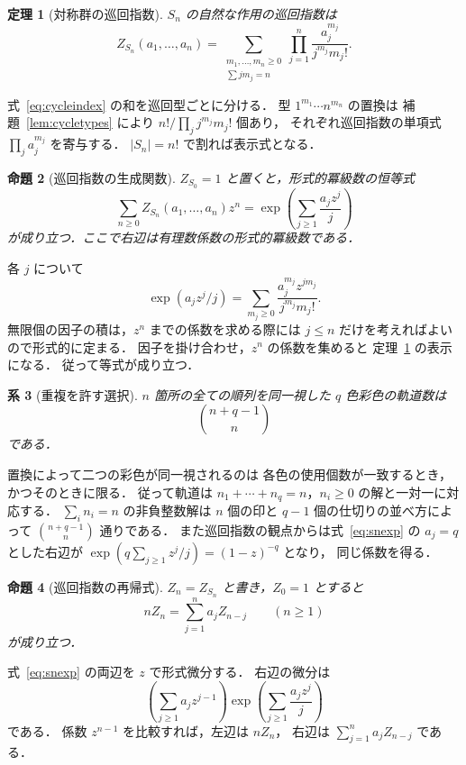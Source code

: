 \documentclass[a5paper,10pt,onecolumn]{jsarticle}
\makeatletter
\theoremstyle{mathnotetheorem}
\newtheorem{theorem}{定理}[section]
\newtheorem{proposition}[theorem]{命題}
\newtheorem{corollary}[theorem]{系}
\renewcommand{\proofname}{証明}
\renewenvironment{proof}[1][\proofname]{%
  \par\pushQED{\qed}\normalfont\topsep4\p@\@plus2\p@\relax
  \trivlist\item[\hskip\labelsep\bfseries #1]\ignorespaces
}{\popQED\endtrivlist\@endpefalse}
\makeatother
\begin{document}
\begin{theorem}[対称群の巡回指数]\label{thm:sncycle}
$S_n$ の自然な作用の巡回指数は
\[
 Z_{S_n}(a_1,\dots,a_n)
 =\sum_{\substack{m_1,\ldots,m_n\ge0\\
 \sum jm_j=n}}
 \prod_{j=1}^n\frac{a_j^{m_j}}{j^{m_j}m_j!}.
\]
\end{theorem}
\begin{proof}
式~\eqref{eq:cycleindex} の和を巡回型ごとに分ける．
型 $1^{m_1}\cdots n^{m_n}$ の置換は
補題~\ref{lem:cycletypes} により
$n!/\prod_j j^{m_j}m_j!$ 個あり，
それぞれ巡回指数の単項式
$\prod_j a_j^{m_j}$ を寄与する．
$|S_n|=n!$ で割れば表示式となる．
\end{proof}

\begin{proposition}[巡回指数の生成関数]\label{prop:snexp}
$Z_{S_0}=1$ と置くと，形式的冪級数の恒等式
\begin{equation}\label{eq:snexp}
 \sum_{n\ge0}Z_{S_n}(a_1,\ldots,a_n)z^n
 =\exp\left(\sum_{j\ge1}\frac{a_jz^j}{j}\right)
\end{equation}
が成り立つ．ここで右辺は有理数係数の形式的冪級数である．
\end{proposition}
\begin{proof}
各 $j$ について
\[
 \exp(a_jz^j/j)
 =\sum_{m_j\ge0}\frac{a_j^{m_j}z^{jm_j}}{j^{m_j}m_j!}.
\]
無限個の因子の積は，$z^n$ までの係数を求める際には
$j\le n$ だけを考えればよいので形式的に定まる．
因子を掛け合わせ，$z^n$ の係数を集めると
定理~\ref{thm:sncycle} の表示になる．
従って等式が成り立つ．
\end{proof}

\begin{corollary}[重複を許す選択]
$n$ 箇所の全ての順列を同一視した $q$ 色彩色の軌道数は
\[
 {n+q-1\choose n}
\]
である．
\end{corollary}
\begin{proof}
置換によって二つの彩色が同一視されるのは
各色の使用個数が一致するとき，かつそのときに限る．
従って軌道は
$n_1+\cdots+n_q=n$，$n_i\ge0$ の解と一対一に対応する．
$\sum_i n_i=n$ の非負整数解は
$n$ 個の印と $q-1$ 個の仕切りの並べ方によって
${n+q-1\choose n}$ 通りである．
また巡回指数の観点からは式~\eqref{eq:snexp} の
$a_j=q$ とした右辺が
$\exp(q\sum_{j\ge1}z^j/j)=(1-z)^{-q}$ となり，
同じ係数を得る．
\end{proof}

\begin{proposition}[巡回指数の再帰式]
$Z_n=Z_{S_n}$ と書き，$Z_0=1$ とすると
\[
 nZ_n=\sum_{j=1}^n a_jZ_{n-j}\qquad(n\ge1)
\]
が成り立つ．
\end{proposition}
\begin{proof}
式~\eqref{eq:snexp} の両辺を $z$ で形式微分する．
右辺の微分は
\[
 \left(\sum_{j\ge1}a_j z^{j-1}\right)
 \exp\left(\sum_{j\ge1}\frac{a_jz^j}{j}\right)
\]
である．
係数 $z^{n-1}$ を比較すれば，左辺は $nZ_n$，
右辺は $\sum_{j=1}^n a_j Z_{n-j}$ である．
\end{proof}
\end{document}
